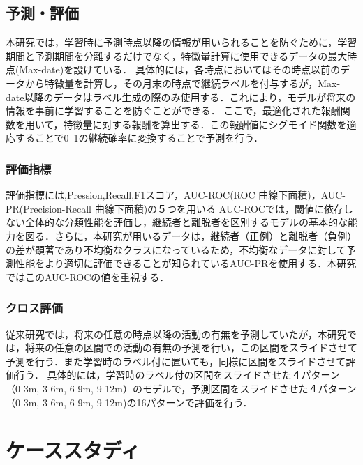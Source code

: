 \documentclass[submit,techrep,noauthor]{ipsj}
\begin{document}
\subsection{予測・評価}
本研究では，学習時に予測時点以降の情報が用いられることを防ぐために，学習期間と予測期間を分離するだけでなく，特徴量計算に使用できるデータの最大時点(Max-date)を設けている．
具体的には，各時点においてはその時点以前のデータから特徴量を計算し，その月末の時点で継続ラベルを付与するが，Max-date以降のデータはラベル生成の際のみ使用する．これにより，モデルが将来の情報を事前に学習することを防ぐことができる．
ここで，最適化された報酬関数を用いて，特徴量に対する報酬を算出する．この報酬値にシグモイド関数を適応することで0~1の継続確率に変換することで予測を行う．

\subsubsection{評価指標}
 評価指標には,Pression,Recall,F1スコア，AUC-ROC(ROC 曲線下面積)，AUC-PR(Precision-Recall 曲線下面積)の５つを用いる
 AUC-ROCでは，閾値に依存しない全体的な分類性能を評価し，継続者と離脱者を区別するモデルの基本的な能力を図る．さらに，本研究が用いるデータは，継続者（正例）と離脱者（負例）の差が顕著であり不均衡なクラスになっているため，不均衡なデータに対して予測性能をより適切に評価できることが知られているAUC-PRを使用する．本研究ではこのAUC-ROCの値を重視する．

\subsubsection{クロス評価}
従来研究では，将来の任意の時点以降の活動の有無を予測していたが，本研究では，将来の任意の区間での活動の有無の予測を行い，この区間をスライドさせて予測を行う．また学習時のラベル付に置いても，同様に区間をスライドさせて評価行う．
具体的には，学習時のラベル付の区間をスライドさせた４パターン（0-3m, 3-6m, 6-9m, 9-12m）のモデルで，予測区間をスライドさせた４パターン（0-3m, 3-6m, 6-9m, 9-12m)の16パターンで評価を行う．


\section{ケーススタディ}
\label{sec:casestudy}
\end{document}

